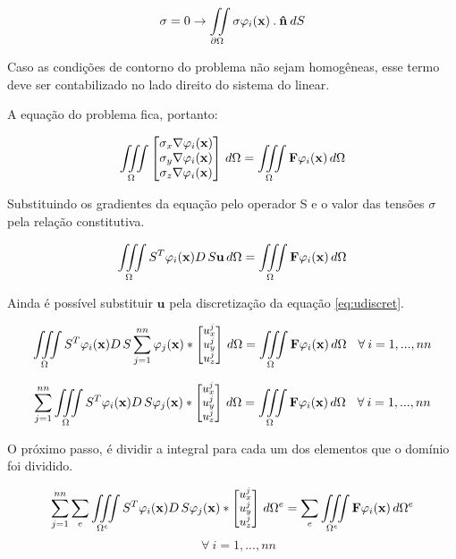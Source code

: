 \begin{equation*}
     \sigma = 0 \rightarrow \iint\limits_{\partial \Omega} \sigma \varphi_i(\mathbf{x}) \: . \: \mathbf{\hat{n}} \: dS
\end{equation*}

Caso as condições de contorno do problema não sejam homogêneas, esse termo deve ser contabilizado no lado direito do sistema do linear.

A equação do problema fica, portanto:

\begin{equation}
\iiint\limits_{\Omega} 
\begin{bmatrix}
 \sigma_x \nabla \varphi_i(\mathbf{x})\\  \sigma_y \nabla \varphi_i(\mathbf{x}) \\  \sigma_z \nabla \varphi_i(\mathbf{x}) 
\end{bmatrix} \, d\Omega
= \iiint\limits_{\Omega} \mathbf{F}\varphi_i(\mathbf{x}) \, d\Omega
\end{equation}


Substituindo os gradientes da equação pelo operador S e o valor das tensões $\sigma$ pela relação constitutiva.

\begin{equation}
\iiint\limits_{\Omega} S^T \varphi_i(\mathbf{x}) D\,S\mathbf{u}  \, d\Omega 
= \iiint\limits_{\Omega} \mathbf{F}\varphi_i(\mathbf{x}) \, d\Omega
\end{equation}

Ainda é possível substituir $\mathbf{u}$ pela discretização da equação \ref{eq:udiscret}.

\begin{equation}\small
\iiint\limits_{\Omega} S^T \varphi_i(\mathbf{x}) D\,S \sum_{j=1}^{nn}  \varphi_j(\mathbf{x})
 * \begin{bmatrix} u^j_x \\ u^j_y \\ u^j_z \end{bmatrix}
 \, d\Omega   =  \iiint\limits_{\Omega} \mathbf{F}\varphi_i(\mathbf{x}) \, d\Omega \quad \forall \: i=1,...,nn
\end{equation}


\begin{equation}\small
\sum_{j=1}^{nn} \iiint\limits_{\Omega} S^T \varphi_i(\mathbf{x}) D\,S   \varphi_j(\mathbf{x})
 * \begin{bmatrix} u^j_x \\ u^j_y \\ u^j_z \end{bmatrix}
 \, d\Omega   =  \iiint\limits_{\Omega} \mathbf{F}\varphi_i(\mathbf{x}) \, d\Omega \quad \forall \: i=1,...,nn
\end{equation}

O próximo passo, é dividir a integral para cada um dos elementos que o domínio foi dividido. 

\begin{equation*}\small
\sum_{j=1}^{nn} \sum\limits_e \iiint\limits_{\Omega^e} S^T \varphi_i(\mathbf{x}) D\,S  \varphi_j(\mathbf{x})
 * \begin{bmatrix} u^j_x \\ u^j_y \\ u^j_z \end{bmatrix}
 \, d\Omega^e   =  \sum\limits_e \iiint\limits_{\Omega^e} \mathbf{F}\varphi_i(\mathbf{x}) \, d\Omega^e
\end{equation*}
\begin{equation*}
 \quad \forall \: i=1,...,nn
\end{equation*}

